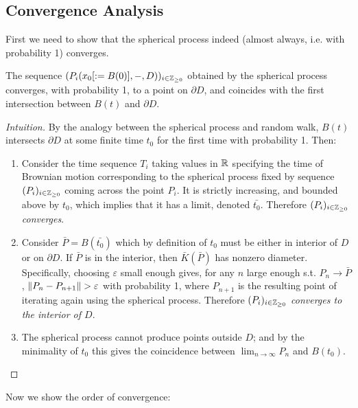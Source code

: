 \documentclass[10pt]{article}
\begin{document}
\subsection{Convergence Analysis}

\textstart
First we need to show that the spherical process indeed (almost always, i.e. with probability 1) converges.

\begin{proposition}
    The sequence $(P_i(x_0 [:= B(0)], -, D))_{i \in \mathbb{Z}_{\geq 0}}$ obtained by the spherical process converges, with probability 1, to a point on $\partial D$, and coincides with the first intersection between $B(t)$ and $\partial D$.
\end{proposition}

\begin{proof}[Intuition]
    By the analogy between the spherical process and random walk, $B(t)$ intersects $\partial D$ at some finite time $t_0$ for the first time with probability 1. Then:
    \begin{enumerate}
        \item Consider the time sequence $T_i$ taking values in $\mathbb{R}$ specifying the time of Brownian motion corresponding to the spherical process fixed by sequence $(P_i)_{i \in \mathbb{Z}_{\geq 0}}$ coming across the point $P_i$. It is strictly increasing, and bounded above by $t_0$, which implies that it has a limit, denoted $\bar{t_0}$. Therefore \emph{$(P_i)_{i \in \mathbb{Z}_{\geq 0}}$ converges}.
        \item Consider $\bar{P} = B(\bar{t_0})$ which by definition of $t_0$ must be either in interior of $D$ or on $\partial D$. If $\bar{P}$ is in the interior, then $\bar{K}(\bar{P})$ has nonzero diameter. Specifically, choosing $\varepsilon$ small enough gives, for any $n$ large enough s.t. $P_n \to \bar{P}$, $\left\|P_n - P_{n+1}\right\| > \varepsilon$ with probability 1, where $P_{n+1}$ is the resulting point of iterating again using the spherical process. Therefore \emph{$(P_i)_{i \in \mathbb{Z}_{\geq 0}}$ converges to the interior of $D$}.
        \item The spherical process cannot produce points outside $D$; and by the minimality of $t_0$ this gives the coincidence between $\lim_{n \to \infty} P_n$ and $B(t_0)$. 
    \end{enumerate}
\end{proof}

\textstart
Now we show the order of convergence:
\end{document}
